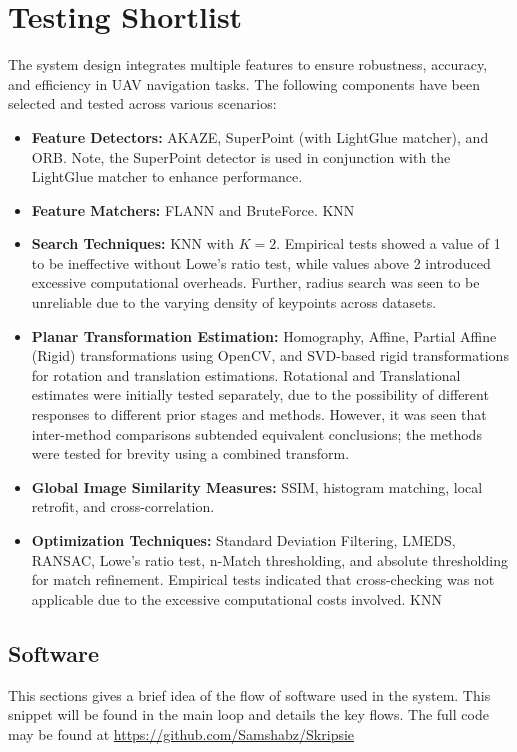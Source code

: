 \section{Testing Shortlist}
\label{sec:testing_shortlist}

The system design integrates multiple features to ensure robustness, accuracy, and efficiency in UAV navigation tasks. The following components have been selected and tested across various scenarios:

\begin{itemize}
    \item \textbf{Feature Detectors:} AKAZE, SuperPoint (with LightGlue matcher), and ORB. Note, the SuperPoint detector is used in conjunction with the LightGlue matcher to enhance performance.
    \item \textbf{Feature Matchers:} FLANN and BruteForce. KNN 
    \item \textbf{Search Techniques:} KNN with \( K=2 \). Empirical tests showed a value of 1 to be ineffective without Lowe's ratio test, while values above 2 introduced excessive computational overheads. Further, radius search was seen to be unreliable due to the varying density of keypoints across datasets.
    \item \textbf{Planar Transformation Estimation:} Homography, Affine, Partial Affine (Rigid) transformations using OpenCV, and SVD-based rigid transformations for rotation and translation estimations. Rotational and Translational estimates were initially tested separately, due to the possibility of different responses to different prior stages and methods. However, it was seen that inter-method comparisons subtended equivalent conclusions; the methods were tested for brevity using a combined transform.
    \item \textbf{Global Image Similarity Measures:} SSIM, histogram matching, local retrofit, and cross-correlation.
    \item \textbf{Optimization Techniques:} Standard Deviation Filtering, LMEDS, RANSAC, Lowe's ratio test, n-Match thresholding, and absolute thresholding for match refinement. Empirical tests indicated that cross-checking was not applicable due to the excessive computational costs involved. KNN
\end{itemize}

\subsection{Software}
This sections gives a brief idea of the flow of software used in the system. This snippet will be found in the main loop and details the key flows. The full code may be found at \url{https://github.com/Samshabz/Skripsie}

